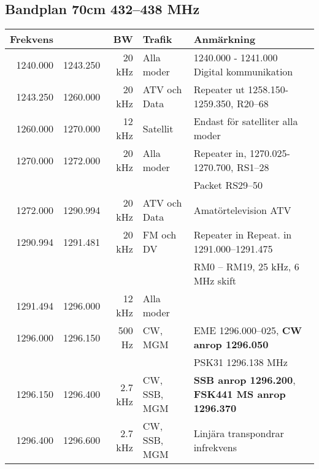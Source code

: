 \documentclass[10pt,swedish,a4paper,twoside]{article}
\begin{document}
\begin{landscape}
	\section{Bandplan 70cm 432--438 MHz}
	\begin{tabular}{rrrll}
		\textbf{Frekvens} &          & \textbf{BW} & \textbf{Trafik} & \textbf{Anmärkning}                                            \\ \hline
		         1240.000 & 1243.250 &      20 kHz & Alla moder      & 1240.000 - 1241.000 Digital kommunikation                      \\ \hline
		         1243.250 & 1260.000 &      20 kHz & ATV och Data    & Repeater ut 1258.150-1259.350, R20--68                         \\ \hline
		         1260.000 & 1270.000 &      12 kHz & Satellit        & Endast för satelliter alla moder                               \\ \hline
		         1270.000 & 1272.000 &      20 kHz & Alla moder      & Repeater in, 1270.025-1270.700, RS1--28                        \\
		                  &          &             &                 & Packet RS29--50                                                \\ \hline
		         1272.000 & 1290.994 &      20 kHz & ATV och Data    & Amatörtelevision ATV                                           \\ \hline
		         1290.994 & 1291.481 &      20 kHz & FM och DV       & Repeater in Repeat. in 1291.000--1291.475                      \\
		                  &          &             &                 & RM0 – RM19, 25 kHz, 6 MHz skift                                \\ \hline
		         1291.494 & 1296.000 &      12 kHz & Alla moder      &  \\ \hline
		         1296.000 & 1296.150 &      500 Hz & CW,  MGM        & EME 1296.000--025, \textbf{CW anrop 1296.050}                  \\
		                  &          &             &                 & PSK31 1296.138 MHz                                             \\ \hline
		         1296.150 & 1296.400 &     2.7 kHz & CW, SSB, MGM    & \textbf{SSB anrop 1296.200}, \textbf{FSK441 MS anrop 1296.370} \\ \hline
		         1296.400 & 1296.600 &     2.7 kHz & CW, SSB, MGM    & Linjära transpondrar infrekvens                                \\ \hline

\end{tabular}
\end{landscape}
\end{document}
